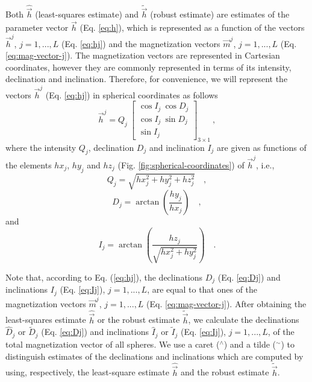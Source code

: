 \documentclass[journal abbreviation, npg]{copernicus}
\begin{document}
Both $\hat{\vec{h}}$ (least-squares estimate) and $\tilde{\vec{h}}$ (robust estimate) are estimates of the parameter vector $\vec{h}$ (Eq. \ref{eq:h}), which is represented as a function of the vectors $\vec{h}^{j}$, $j = 1, ..., L$ (Eq. \ref{eq:hj}) and the magnetization vectors $\vec{m}^{j}$, $j = 1, ..., L$ (Eq. \ref{eq:mag-vector-j}). The magnetization vectors are represented in Cartesian coordinates, however they are commonly represented in terms of its intensity, declination and inclination. Therefore, for convenience, we will represent the vectors $\vec{h}^{j}$ (Eq. \ref{eq:hj}) in spherical coordinates as follows
\begin{equation}
\vec{h}^{j} = Q_{j} \:
\left[
\begin{array}{c}
\cos I_{j} \: \cos D_{j} \\
\cos I_{j} \: \sin D_{j} \\
\sin I_{j}
\end{array}
\right]_{3 \times 1} \: ,
\label{eq:hj-spheric}
\end{equation}
where the intensity $Q_{j}$, declination $D_{j}$ and inclination $I_{j}$ are given as functions of the elements $hx_{j}$, $hy_{j}$ and $hz_{j}$ (Fig. \ref{fig:spherical-coordinates}) of $\vec{h}^{j}$, i.e.,
\begin{equation}
Q_{j} = \sqrt{hx_{j}^{2} + hy_{j}^{2} + hz_{j}^{2}} \quad ,
\label{eq:Qj}
\end{equation}
\begin{equation}
D_{j} = \arctan \left( \dfrac{hy_{j}}{hx_{j}} \right) \quad ,
\label{eq:Dj}
\end{equation}
and
\begin{equation}
I_{j} = \arctan \left( \dfrac{hz_{j}}{\sqrt{hx_{j}^{2} + hy_{j}^{2}}} \right) \quad .
\label{eq:Ij}
\end{equation}

Note that, according to Eq. (\ref{eq:hj}), the declinations $D_{j}$ (Eq. \ref{eq:Dj}) and inclinations $I_{j}$ (Eq. \ref{eq:Ij}), $j = 1, ..., L$, are equal to that ones of the magnetization vectors $\vec{m}^{j}$, $j = 1, ..., L$ (Eq. \ref{eq:mag-vector-j}). After obtaining the least-squares estimate $\hat{\vec{h}}$ or the robust estimate $\tilde{\vec{h}}$, we calculate the declinations $\hat{D}_{j}$ or $\tilde{D}_{j}$ (Eq. \ref{eq:Dj}) and inclinations $\hat{I}_{j}$ or $\tilde{I}_{j}$ (Eq. \ref{eq:Ij}), $j = 1, ..., L$, of the total magnetization vector of all spheres. We use a caret ($^\wedge$) and a tilde ($^\sim$) to distinguish estimates of the declinations and inclinations which are computed by using, respectively, the least-square estimate $\hat{\vec{h}}$ and the robust estimate $\tilde{\vec{h}}$. 
\end{document}
